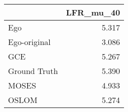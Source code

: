 \begin{tabular}{lr}
\toprule
{} & LFR_mu_40 \\
\midrule
Ego          &     5.317 \\
Ego-original &     3.086 \\
GCE          &     5.267 \\
Ground Truth &     5.390 \\
MOSES        &     4.933 \\
OSLOM        &     5.274 \\
\bottomrule
\end{tabular}
